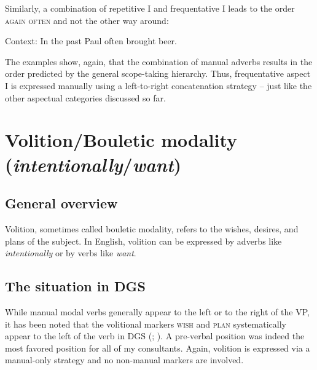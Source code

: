 \noindent Similarly, a combination of repetitive I and frequentative I leads to the order \textsc{again often} and not the other way around: 

\begin{exe}
\ex Context: In the past Paul often brought beer. \label{xcombininghabitualandfrequentative}\begin{xlist} 
\end{xlist}
\end{exe} 

\noindent The examples show, again, that the combination of manual adverbs results in the order predicted by the general scope-taking hierarchy. Thus, frequentative aspect I is expressed manually using a left-to-right concatenation strategy -- just like the other aspectual categories discussed so far.




\section{Volition/Bouletic modality (\textit{intentionally}/\textit{want})}\label{volition}
\subsection{General overview}
Volition, sometimes called bouletic modality, refers to the wishes, desires, and plans of the subject. In English, volition can be expressed by adverbs like \textit{intentionally} or by verbs like \textit{want}.

\subsection{The situation in DGS}


While manual modal verbs generally appear to the left or to the right of the VP, it has been noted that the volitional markers \textsc{wish} and \textsc{plan} systematically appear to the left of the verb in DGS (\citealt[326]{happ2014vork}; \citealt[20]{bross2017scope}). A pre-verbal position was indeed the most favored position for all of my consultants. Again, volition is expressed via a manual-only strategy and no non-manual markers are involved. 

